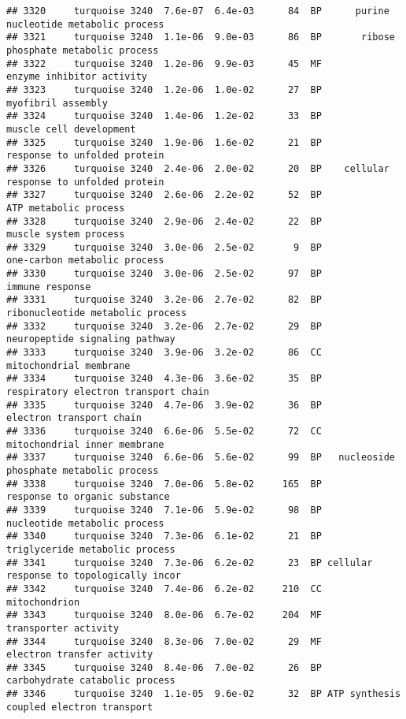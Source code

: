 \documentclass[]{article}
\begin{document}
\begin{verbatim}
## 3320     turquoise 3240  7.6e-07  6.4e-03      84  BP      purine nucleotide metabolic process
## 3321     turquoise 3240  1.1e-06  9.0e-03      86  BP       ribose phosphate metabolic process
## 3322     turquoise 3240  1.2e-06  9.9e-03      45  MF                enzyme inhibitor activity
## 3323     turquoise 3240  1.2e-06  1.0e-02      27  BP                       myofibril assembly
## 3324     turquoise 3240  1.4e-06  1.2e-02      33  BP                  muscle cell development
## 3325     turquoise 3240  1.9e-06  1.6e-02      21  BP             response to unfolded protein
## 3326     turquoise 3240  2.4e-06  2.0e-02      20  BP    cellular response to unfolded protein
## 3327     turquoise 3240  2.6e-06  2.2e-02      52  BP                    ATP metabolic process
## 3328     turquoise 3240  2.9e-06  2.4e-02      22  BP                    muscle system process
## 3329     turquoise 3240  3.0e-06  2.5e-02       9  BP             one-carbon metabolic process
## 3330     turquoise 3240  3.0e-06  2.5e-02      97  BP                          immune response
## 3331     turquoise 3240  3.2e-06  2.7e-02      82  BP         ribonucleotide metabolic process
## 3332     turquoise 3240  3.2e-06  2.7e-02      29  BP           neuropeptide signaling pathway
## 3333     turquoise 3240  3.9e-06  3.2e-02      86  CC                   mitochondrial membrane
## 3334     turquoise 3240  4.3e-06  3.6e-02      35  BP     respiratory electron transport chain
## 3335     turquoise 3240  4.7e-06  3.9e-02      36  BP                 electron transport chain
## 3336     turquoise 3240  6.6e-06  5.5e-02      72  CC             mitochondrial inner membrane
## 3337     turquoise 3240  6.6e-06  5.6e-02      99  BP   nucleoside phosphate metabolic process
## 3338     turquoise 3240  7.0e-06  5.8e-02     165  BP            response to organic substance
## 3339     turquoise 3240  7.1e-06  5.9e-02      98  BP             nucleotide metabolic process
## 3340     turquoise 3240  7.3e-06  6.1e-02      21  BP           triglyceride metabolic process
## 3341     turquoise 3240  7.3e-06  6.2e-02      23  BP cellular response to topologically incor
## 3342     turquoise 3240  7.4e-06  6.2e-02     210  CC                            mitochondrion
## 3343     turquoise 3240  8.0e-06  6.7e-02     204  MF                     transporter activity
## 3344     turquoise 3240  8.3e-06  7.0e-02      29  MF               electron transfer activity
## 3345     turquoise 3240  8.4e-06  7.0e-02      26  BP           carbohydrate catabolic process
## 3346     turquoise 3240  1.1e-05  9.6e-02      32  BP ATP synthesis coupled electron transport

\end{verbatim}
\end{document}
